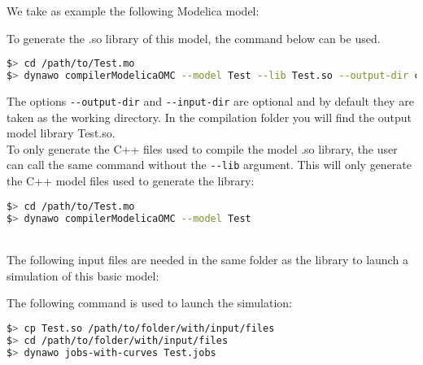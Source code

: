 \documentclass[a4paper, 12pt]{report}
\begin{document}
We take as example the following Modelica model:

To generate the .so library of this model, the command below can be
used. \\

\begin{lstlisting}[language=bash,deletekeywords={jobs,help}]
$> cd /path/to/Test.mo
$> dynawo compilerModelicaOMC --model Test --lib Test.so --output-dir compilation --input-dir .
\end{lstlisting}

The options \lstinline[language=bash]{--output-dir} and \lstinline[language=bash]{--input-dir} are optional and by default they are taken as the working directory. In the compilation folder you will find the output model library Test.so. \\

To only generate the C++ files used to compile the model .so library, the user can call the same command without the \lstinline[language=bash]{--lib} argument.
This will only generate the C++ model files used to generate the library:
\begin{lstlisting}[language=bash,deletekeywords={jobs,help}]
$> cd /path/to/Test.mo
$> dynawo compilerModelicaOMC --model Test
\end{lstlisting}

~~\\
The following input files are needed in the same folder as the library to launch a \Dynawo simulation of this basic model:






The following command is used to launch the simulation:
\begin{lstlisting}[language=bash,deletekeywords={jobs,help}]
$> cp Test.so /path/to/folder/with/input/files
$> cd /path/to/folder/with/input/files
$> dynawo jobs-with-curves Test.jobs
\end{lstlisting}
\end{document}
